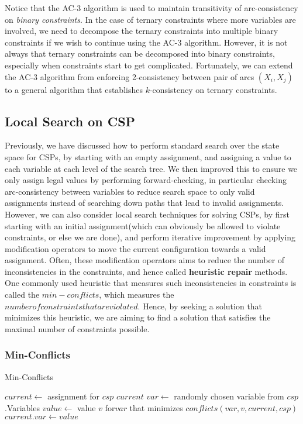 \documentclass[12pt]{article}
\begin{document}
Notice that the AC-3 algorithm is used to maintain transitivity of arc-consistency on \textit{binary constraints}. In the case of ternary constraints where more variables are involved, we need to decompose the ternary constraints into multiple binary constraints if we wish to continue using the AC-3 algorithm. However, it is not always that ternary constraints can be decomposed into binary constraints, especially when constraints start to get complicated. Fortunately, we can extend the AC-3 algorithm from enforcing 2-consistency between pair of arcs $(X_i, X_j)$ to a general algorithm that establishes $k$-consistency on ternary constraints.

\subsection{Local Search on CSP}

Previously, we have discussed how to perform standard search over the state space for CSPs, by starting with an empty assignment, and assigning a value to each variable at each level of the search tree. We then improved this to ensure we only assign legal values by performing forward-checking, in particular checking arc-consistency between variables to reduce search space to only valid assignments instead of searching down paths that lead to invalid assignments.\\

However, we can also consider local search techniques for solving CSPs, by first starting with an initial assignment(which can obviously be allowed to violate constraints, or else we are done), and perform iterative improvement by applying modification operators to move the current configuration towards a valid assignment. Often, these modification operators aims to reduce the number of inconsistencies in the constraints, and hence called \textbf{heuristic repair} methods. One commonly used heuristic that measures such inconsistencies in constraints is called the $min-conflicts$, which measures the $number of constraints that are violated$. Hence, by seeking a solution that minimizes this heuristic, we are aiming to find a solution that satisfies the maximal number of constraints possible.

\subsubsection{Min-Conflicts}


\begin{algorithm}
\caption{Min-Conflicts}\label{euclid}
\begin{algorithmic}[1]
\State $current \leftarrow$ assignment for $csp$
\Return $current$
\EndIf
\State $var \leftarrow$ randomly chosen variable from $csp$.Variables
\State $value \leftarrow$ value $v$ for$var$ that minimizes $conflicts(var, v, current, csp)$
\State $current.var \leftarrow value$
\EndFor
\end{algorithmic}
\end{algorithm}
\end{document}
